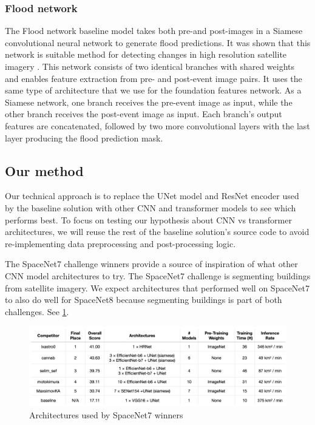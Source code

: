 \documentclass[10pt,twocolumn,letterpaper]{article}
\begin{document}
\subsubsection{Flood network}
The Flood network baseline model takes both pre-and post-images in a Siamese convolutional neural network \cite{koch2015siamese} to
generate flood predictions. It was shown that this network is suitable
method for detecting changes in high resolution satellite
imagery \cite{8451652}. This network consists of two identical
branches with shared weights and enables feature extraction
from pre- and post-event image pairs. It uses the same
type of architecture that we use for the foundation features
network. As a Siamese network, one branch receives the
pre-event image as input, while the other branch receives
the post-event image as input. Each branch’s output features
are concatenated, followed by two more convolutional layers
with the last layer producing the 
flood prediction mask.


\subsection{Our method}

Our technical approach is to replace the UNet model and ResNet encoder used by the baseline solution with other CNN and transformer models to see which performs best. To focus on testing our hypothesis about CNN vs transformer architectures, we will reuse the rest of the baseline solution’s source code \cite{spacenet8_baseline} to avoid re-implementing data preprocessing and post-processing logic.

The SpaceNet7 challenge \cite{spacenet7} winners \cite{spacenet7_solutions} provide a source of inspiration of what other CNN model architectures to try. The SpaceNet7 challenge is segmenting buildings from satellite imagery. We expect architectures that performed well on SpaceNet7 to also do well for SpaceNet8 because segmenting buildings is part of both challenges. See \ref{fig:spacenet7}.

\begin{figure}[t]
  \centering
   \includegraphics[width=1\linewidth]{figures/spacenet7-winners.png}
   \caption{Architectures used by SpaceNet7 winners}
   \label{fig:spacenet7}
\end{figure}
\end{document}
